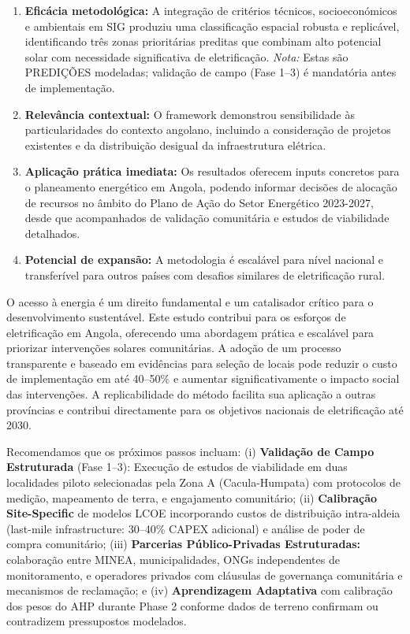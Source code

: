 \documentclass[12pt, a4paper]{article}
\begin{document}
{{{{{{{{{{{{\begin{enumerate}
\item \textbf{Eficácia metodológica:} A integração de critérios técnicos, socioeconómicos e ambientais em SIG produziu uma classificação espacial robusta e replicável, identificando três zonas prioritárias preditas que combinam alto potencial solar com necessidade significativa de eletrificação. \textit{Nota:} Estas são PREDIÇÕES modeladas; validação de campo (Fase 1--3) é mandatória antes de implementação.

\item \textbf{Relevância contextual:} O framework demonstrou sensibilidade às particularidades do contexto angolano, incluindo a consideração de projetos existentes e da distribuição desigual da infraestrutura elétrica.

\item \textbf{Aplicação prática imediata:} Os resultados oferecem inputs concretos para o planeamento energético em Angola, podendo informar decisões de alocação de recursos no âmbito do Plano de Ação do Setor Energético 2023-2027, desde que acompanhados de validação comunitária e estudos de viabilidade detalhados.

\item \textbf{Potencial de expansão:} A metodologia é escalável para nível nacional e transferível para outros países com desafios similares de eletrificação rural.
\end{enumerate}

O acesso à energia é um direito fundamental e um catalisador crítico para o desenvolvimento sustentável. Este estudo contribui para os esforços de eletrificação em Angola, oferecendo uma abordagem prática e escalável para priorizar intervenções solares comunitárias. A adoção de um processo transparente e baseado em evidências para seleção de locais pode reduzir o custo de implementação em até 40--50\% e aumentar significativamente o impacto social das intervenções. A replicabilidade do método facilita sua aplicação a outras províncias e contribui directamente para os objetivos nacionais de eletrificação até 2030.

Recomendamos que os próximos passos incluam: (i) \textbf{Validação de Campo Estruturada} (Fase 1--3): Execução de estudos de viabilidade em duas localidades piloto selecionadas pela Zona A (Cacula-Humpata) com protocolos de medição, mapeamento de terra, e engajamento comunitário; (ii) \textbf{Calibração Site-Specific} de modelos LCOE incorporando custos de distribuição intra-aldeia (last-mile infrastructure: 30--40\% CAPEX adicional) e análise de poder de compra comunitário; (iii) \textbf{Parcerias Público-Privadas Estruturadas:} colaboração entre MINEA, municipalidades, ONGs independentes de monitoramento, e operadores privados com cláusulas de governança comunitária e mecanismos de reclamação; e (iv) \textbf{Aprendizagem Adaptativa} com calibração dos pesos do AHP durante Phase 2 conforme dados de terreno confirmam ou contradizem pressupostos modelados.

}}}}}}}}}}}}
\end{document}
